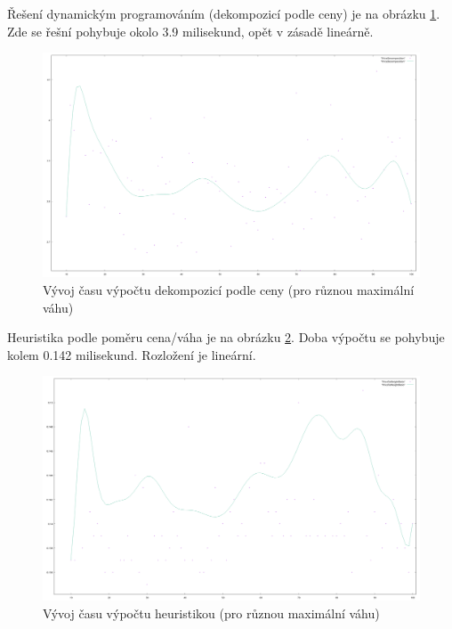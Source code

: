 \documentclass[12pt,a4paper]{article}
\begin{document}
Řešení dynamickým programováním (dekompozicí podle ceny) je na obrázku \ref{maxWeight/PriceDecomposition}. Zde se řešní pohybuje okolo 3.9 milisekund, opět v zásadě lineárně.

\begin{figure}[H]
\begin{center}
\includegraphics[width=\textwidth]{maxWeight/PriceDecomposition}
\caption{Vývoj času výpočtu dekompozicí podle ceny (pro různou maximální váhu)}
\label{maxWeight/PriceDecomposition}
\end{center}
\end{figure}

Heuristika podle poměru cena/váha je na obrázku \ref{maxWeight/PriceToWeightRatio}. Doba výpočtu se pohybuje kolem 0.142 milisekund. Rozložení je lineární.

\begin{figure}[H]
\begin{center}
\includegraphics[width=\textwidth]{maxWeight/PriceToWeightRatio}
\caption{Vývoj času výpočtu heuristikou (pro různou maximální váhu)}
\label{maxWeight/PriceToWeightRatio}
\end{center}
\end{figure}
\end{document}
